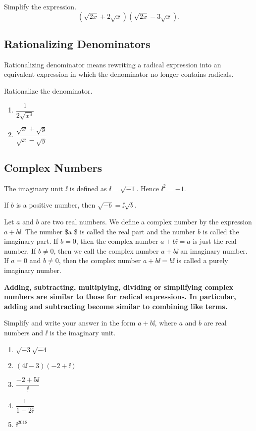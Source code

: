\begin{example}
  Simplify the expression. \[
  (\sqrt{2x}+2\sqrt{x})(\sqrt{2x}-3\sqrt{x}).
  \]
\end{example}
\vspace*{4\baselineskip}

\hypertarget{rationalizing-denominators}{%
\subsection{Rationalizing
Denominators}\label{rationalizing-denominators}}

Rationalizing denominator means rewriting a radical expression into an
equivalent expression in which the denominator no longer contains
radicals.

\begin{example}
  Rationalize the denominator.
  
  \begin{enumerate}
  \item
    \(\dfrac{1}{2\sqrt{x^3}}\)
  \item
    \(\dfrac{\sqrt{x}+\sqrt{y}}{\sqrt{x}-\sqrt{y}}\)
  \end{enumerate}
\end{example}

\hypertarget{complex-numbers}{%
\subsection{Complex Numbers}\label{complex-numbers}}

The imaginary unit \(\ii\) is defined as \(\ii=\sqrt{-1}\). Hence
\(\ii^2=-1\).

If \(b\) is a positive number, then \(\sqrt{-b}=\ii\sqrt{b}\).

Let \(a\) and \(b\) are two real numbers. We define a complex number by
the expression \(a+b \ii\). The number \$a \$ is called the real part
and the number \(b\) is called the imaginary part. If \(b=0\), then the
complex number \(a+b\ii=a\) is just the real number. If \(b\neq 0\),
then we call the complex number \(a+b\ii\) an imaginary number. If
\(a=0\) and \(b\neq 0\), then the complex number \(a+b\ii=b\ii\) is
called a purely imaginary number.

\textbf{Adding, subtracting, multiplying, dividing or simplifying
complex numbers are similar to those for radical expressions. In
particular, adding and subtracting become similar to combining like
terms.}

\begin{example}
  Simplify and write your answer in the form \(a+b\ii\), where \(a\) and
  \(b\) are real numbers and \(\ii\) is the imaginary unit.
  
  \begin{enumerate}
  \item
    \(\sqrt{-3}\sqrt{-4}\)
  \item
    \((4\ii-3)(-2+\ii)\)
  \item
    \(\dfrac{-2+5\ii}{\ii}\)
  \item
    \(\dfrac{1}{1-2\ii}\)
  \item
    \(\ii^{2018}\)
  \end{enumerate}
\end{example}

